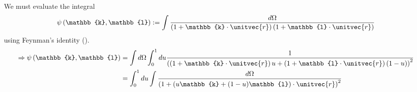 \item

We must evaluate the integral
\[
    \psi \left(\mathbb{k}, \mathbb{l} \right)
    := \int \frac{d\Omega}{\left( 1 + \mathbb{k} \cdot \unitvec{r} \right) \left( 1 + \mathbb{l} \cdot \unitvec{r} \right)}
\]
using Feynman's identity ().
\begin{align*}
    \Rightarrow \psi \left(\mathbb{k}, \mathbb{l} \right)
    &= \int d\Omega \int_0^1 du \inv{{\left(
        \left( 1 + \mathbb{k} \cdot \unitvec{r} \right) u
        + \left( 1 + \mathbb{l} \cdot \unitvec{r} \right) (1 - u)
    \right)}^2} \\
    &= \int_0^1 du \int \frac{d\Omega}{{\left(
        1 + \left(u \mathbb{k} + (1 - u) \mathbb{l}\right) \cdot \unitvec{r}
    \right)}^2}
\end{align*}

